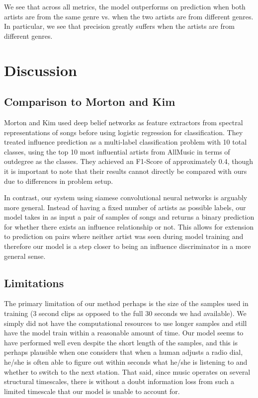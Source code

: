 We see that across all metrics, the model outperforms on prediction when both artists are from the same genre vs. when the two artists are from different genres. In particular, we see that precision greatly suffers when the artists are from different genres.


\section{Discussion}
\subsection{Comparison to Morton and Kim}
Morton and Kim \cite{morton2015acoustic} used deep belief networks \cite{hinton2006fast} as feature extractors from spectral representations of songs before using logistic regression for classification. They treated influence prediction as a multi-label classification problem with 10 total classes, using the top 10 most influential artists from AllMusic in terms of outdegree as the classes. They achieved an F1-Score of approximately 0.4, though it is important to note that their results cannot directly be compared with ours due to differences in problem setup.

In contrast, our system using siamese convolutional neural networks is arguably more general. Instead of having a fixed number of artists as possible labels, our model takes in as input a pair of samples of songs and returns a binary prediction for whether there exists an influence relationship or not. This allows for extension to prediction on pairs where neither artist was seen during model training and therefore our model is a step closer to being an influence discriminator in a more general sense.

\subsection{Limitations}
The primary limitation of our method perhaps is the size of the samples used in training (3 second clips as opposed to the full 30 seconds we had available). We simply did not have the computational resources to use longer samples and still have the model train within a reasonable amount of time. Our model seems to have performed well even despite the short length of the samples, and this is perhaps plausible when one considers that when a human adjusts a radio dial, he/she is often able to figure out within seconds what he/she is listening to and whether to switch to the next station. That said, since music operates on several structural timescales, there is without a doubt information loss from such a limited timescale that our model is unable to account for.

